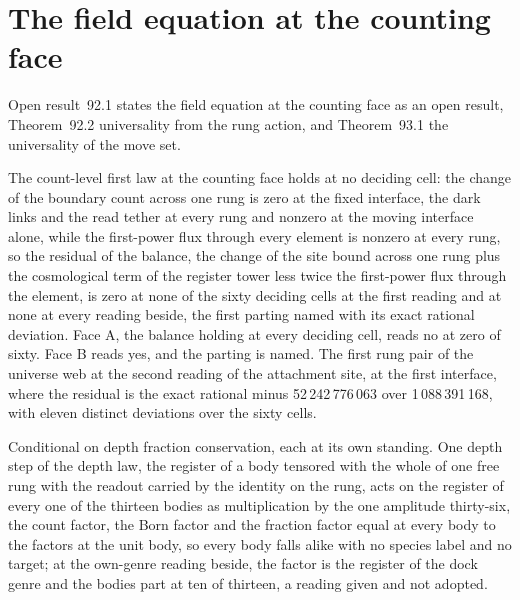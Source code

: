 \section{The field equation at the counting face}\label{mod:X-2-field-equation-at-the-counting-face}
\label{narr:open:10-2}Open result~92.1 states the field equation at the counting face as an open result, Theorem~92.2 universality from the rung action, and Theorem~93.1 the universality of the move set.
\begin{chwall}\label{box:X-2-field-equation-at-the-counting-face:1}
The count-level first law at the counting face holds at no deciding cell: the change of the boundary count across one rung is zero at the fixed interface, the dark links and the read tether at every rung and nonzero at the moving interface alone, while the first-power flux through every element is nonzero at every rung, so the residual of the balance, the change of the site bound across one rung plus the cosmological term of the register tower less twice the first-power flux through the element, is zero at none of the sixty deciding cells at the first reading and at none at every reading beside, the first parting named with its exact rational deviation. Face A, the balance holding at every deciding cell, reads no at zero of sixty. Face B reads yes, and the parting is named. The first rung pair of the universe web at the second reading of the attachment site, at the first interface, where the residual is the exact rational minus 52\,242\,776\,063 over 1\,088\,391\,168, with eleven distinct deviations over the sixty cells.
\end{chwall}
\begin{chconditional}\label{box:X-2-field-equation-at-the-counting-face:2}
Conditional on depth fraction conservation, each at its own standing. One depth step of the depth law, the register of a body tensored with the whole of one free rung with the readout carried by the identity on the rung, acts on the register of every one of the thirteen bodies as multiplication by the one amplitude thirty-six, the count factor, the Born factor and the fraction factor equal at every body to the factors at the unit body, so every body falls alike with no species label and no target; at the own-genre reading beside, the factor is the register of the dock genre and the bodies part at ten of thirteen, a reading given and not adopted.
\end{chconditional}
